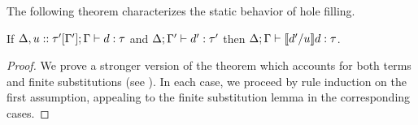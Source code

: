 

The following theorem characterizes the static behavior of hole filling.
\begin{thm}[Filling]
  If $\Delta, u :: \tau'[\Gamma']; \Gamma \vdash d : \tau$
  and $\Delta; \Gamma' \vdash d' : \tau'$
  then $\Delta; \Gamma \vdash \llbracket d' / u\rrbracket d : \tau$.
\end{thm}
\begin{proof}
We prove a stronger version of the theorem which accounts for both terms and finite substitutions (see \cite{Nanevski2008}). In each case, we proceed by rule induction on the first assumption, appealing to the finite substitution lemma in the corresponding cases.
\end{proof}

